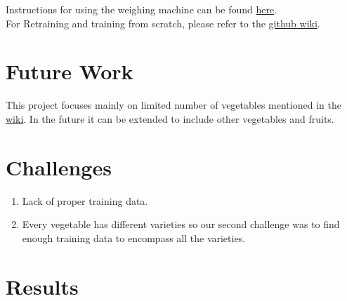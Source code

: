 \documentclass[a4paper,12pt,oneside]{book}
\begin{document}
Instructions for using the weighing machine can be found \href{https://github.com/eYSIP-2017/eYSIP-2017_Vegetable-Identification-Using-Transfer-Learning/tree/master/Documentation/Manuals}{here}.\\
For Retraining and training from scratch, please refer to the \href{https://github.com/eYSIP-2017/eYSIP-2017_Vegetable-Identification-Using-Transfer-Learning/wiki}{github wiki}.

 

\section{Future Work}
This project focuses mainly on limited number of vegetables mentioned in the \href{https://github.com/eYSIP-2017/eYSIP-2017_Vegetable-Identification-Using-Transfer-Learning/wiki/List-of-Vegetables}{wiki}. In the future it can be extended to include other vegetables and fruits.

\newpage
\section{Challenges}
\begin{enumerate}
	\item Lack of proper training data.
	\item Every vegetable has different varieties so our second challenge was to find enough training data to encompass all the varieties.
\end{enumerate}

\section{Results}
\end{document}
